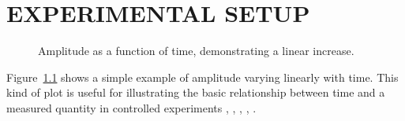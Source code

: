 \chapter{\uppercase{Experimental Setup}}

\begin{figure}[h!]
    \centering
    \caption{Amplitude as a function of time, demonstrating a linear increase.}
    \label{fig:time_vs_amplitude}
\end{figure}
Figure~\ref{fig:time_vs_amplitude} shows a simple example of amplitude varying linearly with time. This kind of plot is useful for illustrating the basic relationship between time and a measured quantity in controlled experiments \cite{kothari2004research}, \cite{weste2016cmosvlsi}, \cite{ozcan2016cognitive}, \cite{waldron2003generalized}, \cite{maedche2005ontology}. 
